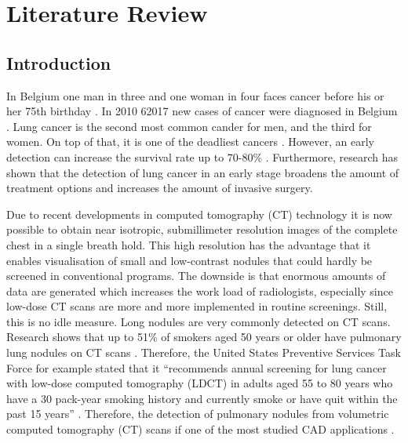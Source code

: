 \section{Literature Review}
\subsection{Introduction}
In Belgium one man in three and one woman in four faces cancer before his or
her 75th birthday \cite{kanker}. In 2010 62017 new cases of cancer were
diagnosed in Belgium \cite{kankerliga}. Lung cancer is the second most common
cander for men, and the third for women.
On top of that, it is one of the deadliest cancers
\cite{zheng}. However, an early detection can increase the survival rate up to 70-80\%
\cite{swensen}. Furthermore, research has shown that the detection of lung
cancer in an early stage broadens the amount of treatment options and increases
the amount of invasive surgery\cite{greenlee}.


Due to recent developments in
computed tomography (CT) technology it is now possible to obtain near isotropic, submillimeter resolution images of the complete chest in a single breath hold.
This high resolution has the advantage that it enables visualisation of small
and low-contrast nodules that could hardly be screened in conventional
programs. The downside is that enormous amounts of data are generated
which increases the work load of radiologists, especially since low-dose CT
scans are more and more implemented in routine screenings. Still, this is no
idle measure. Long nodules are very commonly detected on CT scans. Research
shows that up to 51\% of smokers aged 50 years or older have pulmonary lung nodules on CT scans \cite{mahon}.
Therefore, the United States Preventive Services Task Force for example stated that it ``recommends annual screening for lung cancer with low-dose computed tomography (LDCT) in adults aged 55 to 80 years who have a 30 pack-year smoking history and currently smoke or have quit
within the past 15 years'' \cite{ups}.
Therefore, the detection of pulmonary nodules from volumetric computed
tomography (CT) scans if one of the most studied CAD applications
\cite{sluimer}.


